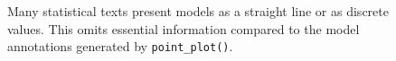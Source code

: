 \documentclass[
  letterpaper,
  DIV=11,
  numbers=noendperiod,
  oneside]{scrartcl}
\begin{document}
\begin{figure}


\caption{\label{fig-point-estimate.column-page-right}Many statistical
texts present models as a straight line or as discrete values. This
omits essential information compared to the model annotations generated
by \texttt{point\_plot()}.}

\end{figure}%
\end{document}
